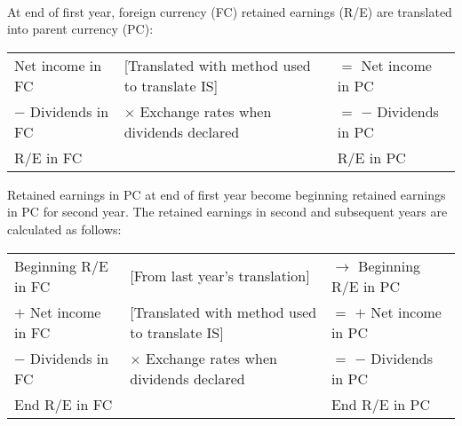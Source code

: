 \begin{method}  \\
At end of first year, foreign currency (FC) retained earnings (R/E) are translated into parent currency (PC):
\begin{flushleft}
\begin{tabularx}{\textwidth}{Xp{20em}X}
\hline
Net income in FC & [Translated with method used to translate IS] & $=$ Net income in PC \\
$-$ Dividends in FC & $\times$ Exchange rates when dividends declared & $=$ $-$ Dividends in PC \\
\hline
R/E in FC & & R/E in PC
\end{tabularx}
\end{flushleft}
Retained earnings in PC at end of first year become beginning retained earnings in PC for second year. The retained earnings in second and subsequent years are calculated as follows:
\begin{flushleft}
\begin{tabularx}{\textwidth}{Xp{20em}X}
\hline
Beginning R/E in FC & [From last year's translation] & $\rightarrow$ Beginning R/E in PC \\
$+$ Net income in FC & [Translated with method used to translate IS] & $=$ $+$ Net income in PC \\
$-$ Dividends in FC & $\times$ Exchange rates when dividends declared & $=$ $-$ Dividends in PC \\
\hline
End R/E in FC & & End R/E in PC
\end{tabularx}
\end{flushleft}
\end{method}

